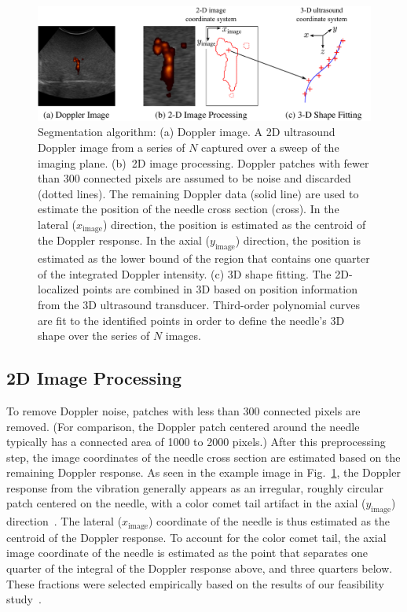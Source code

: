 \begin{figure}[!t]
\centering
\includegraphics[width = \textwidth]{Images/Chapter2/Segmentation/Segmentation}%
\caption[Doppler ultrasound segmentation algorithm]{Segmentation algorithm: (a) Doppler image. A 2D ultrasound Doppler image from a series of $N$ captured over a sweep of the imaging plane. (b)~2D image processing. Doppler patches with fewer than 300 connected pixels are assumed to be noise and discarded (dotted lines). The remaining Doppler data (solid line) are used to estimate the position of the needle cross section (cross). In the lateral ($x_\text{image}$) direction, the position is estimated as the centroid of the Doppler response. In the axial ($y_\text{image}$) direction, the position is estimated as the lower bound of the region that contains one quarter of the integrated Doppler intensity. (c) 3D shape fitting. The 2D-localized points are combined in 3D based on position information from the 3D ultrasound transducer. Third-order polynomial curves are fit to the identified points in order to define the needle's 3D shape over the series of $N$ images.}
\label{fig:Segmentation}
\end{figure}

\subsection{2D Image Processing}
To remove Doppler noise, patches with less than 300 connected pixels are removed. (For comparison, the Doppler patch centered around the needle typically has a connected area of 1000 to 2000 pixels.) After this preprocessing step, the image coordinates of the needle cross section are estimated based on the remaining Doppler response. As seen in the example image in Fig.~\ref{fig:Segmentation}, the Doppler response from the vibration generally appears as an irregular, roughly circular patch centered on the needle, with a color comet tail artifact in the axial ($y_\text{image}$) direction~\cite{Tchelepi2009}. The lateral ($x_\text{image}$) coordinate of the needle is thus estimated as the centroid of the Doppler response. To account for the color comet tail, the axial image coordinate of the needle is estimated as the point that separates one quarter of the integral of the Doppler response above, and three quarters below. These fractions were selected empirically based on the results of our feasibility study~\cite{Adebar2013}. 

